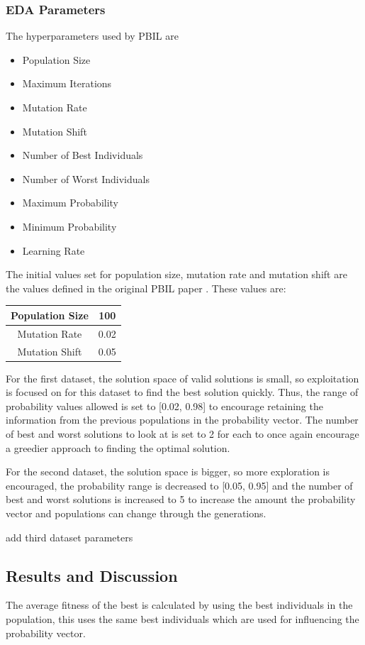 \documentclass{article}
\begin{document}
\subsubsection*{EDA Parameters}
The hyperparameters used by PBIL are 
\begin{itemize}
	\item Population Size
	\item Maximum Iterations
	\item Mutation Rate
	\item Mutation Shift
	\item Number of Best Individuals
	\item Number of Worst Individuals
	\item Maximum Probability
	\item Minimum Probability
	\item Learning Rate
\end{itemize}
The initial values set for population size, mutation rate and mutation shift are the values defined in the original PBIL paper \cite{baluja1994population}. These values are:
\begin{center}
\begin{tabular}{|c|c|}
	\hline
	Population Size & 100 \\
	\hline
	Mutation Rate & 0.02 \\
	\hline
	Mutation Shift & 0.05 \\
	\hline
\end{tabular}
\end{center}
\noindent For the first dataset, the solution space of valid solutions is small, so exploitation is focused on for this dataset to find the best solution quickly. Thus, the range of probability values allowed is set to [0.02, 0.98] to encourage retaining the information from the previous populations in the probability vector. The number of best and worst solutions to look at is set to 2 for each to once again encourage a greedier approach to finding the optimal solution. \par
\noindent For the second dataset, the solution space is bigger, so more exploration is encouraged, the probability range is decreased to [0.05, 0.95] and the number of best and worst solutions is increased to 5 to increase the amount the probability vector and populations can change through the generations. \par
\noindent add third dataset parameters \par

\subsection*{Results and Discussion}
The average fitness of the best is calculated by using the best individuals in the population, this uses the same best individuals which are used for influencing the probability vector. \par 
\end{document}
